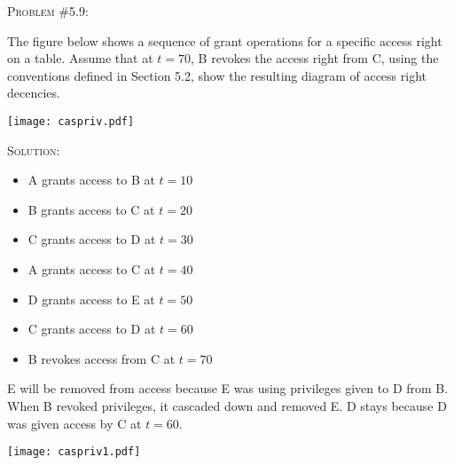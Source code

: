 \documentclass[12pt]{article}
\newenvironment{problem}[1]
{\begin{mdframed}[linewidth=0.8pt]
        \textsc{Problem #1:}

}
    {\end{mdframed}}
\newenvironment{solution}
    {\textsc{Solution:}\\}
    {\newpage}%
\begin{document}
	\begin{problem}{\#5.9}
		The figure below shows a sequence of grant operations for a specific access
		right on a table. Assume that at $t=70$, B revokes the access right from C, using the
		conventions defined in Section 5.2, show the resulting diagram of access right
		decencies.
		\begin{center}
			\texttt{[image: caspriv.pdf]}
		\end{center}
	\end{problem}
	\begin{solution}
		\begin{itemize}
			\item A grants access to B at $t=10$ 
			\item B grants access to C at $t=20$ 
			\item C grants access to D at $t=30$ 
			\item A grants access to C at $t=40$ 
			\item D grants access to E at $t=50$ 
			\item C grants access to D at $t=60$ 
			\item B revokes access from C at $t=70$
		\end{itemize}

		E will be removed from access because E was using privileges given to D from B. When
		B revoked privileges, it cascaded down and removed E. D stays because D was given
		access by C at $t=60$.
		\begin{center}
			\texttt{[image: caspriv1.pdf]}
		\end{center}
	\end{solution}
\end{document}

